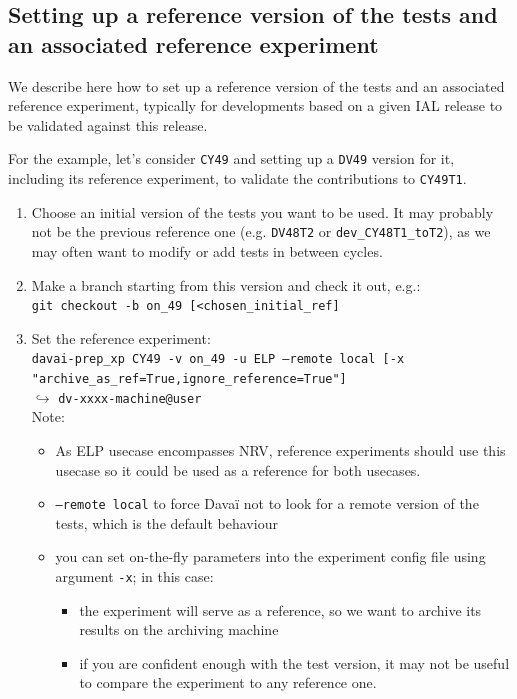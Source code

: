 \documentclass[a4paper,10pt,twoside]{article}
\begin{document}
\begin{appendix}
\subsection{Setting up a reference version of the tests and an associated reference experiment\label{sect:set_a_ref_tests_version}}
We describe here how to set up a reference version of the tests and an associated reference experiment, typically for developments based on a given IAL release to be validated against this release.

For the example, let's consider \texttt{CY49} and setting up a \texttt{DV49} version for it, including its reference experiment, to validate the contributions to \texttt{CY49T1}.
\begin{enumerate}[label=\arabic*),start=0]
 \item Choose an initial version of the tests you want to be used. It may probably not be the previous reference one (e.g. \texttt{DV48T2} or \texttt{dev\_CY48T1\_toT2}), as we may often want to modify or add tests in between cycles.
 \item Make a branch starting from this version and check it out, e.g.:\\
 \texttt{git checkout -b on\_49 [<chosen\_initial\_ref]}
 \item Set the reference experiment:\\
 \texttt{davai-prep\_xp CY49 -v on\_49 -u ELP --remote local [-x "archive\_as\_ref=True,ignore\_reference=True"]}\\
 $\hookrightarrow$ \texttt{dv-xxxx-machine@user}\\
 Note:
 \begin{itemize}
  \item As ELP usecase encompasses NRV, reference experiments should use this usecase so it could be used as a reference for both usecases.
  \item \texttt{--remote local} to force Davaï not to look for a  remote version of the tests, which is the default behaviour
  \item you can set on-the-fly parameters into the experiment config file using argument \texttt{-x}; in this case:
  \begin{itemize}
   \item the experiment will serve as a reference, so we want to archive its results on the archiving machine
   \item if you are confident enough with the test version, it may not be useful to compare the experiment to any reference one.
  \end{itemize}

\end{itemize}
\end{enumerate}
\end{appendix}
\end{document}
